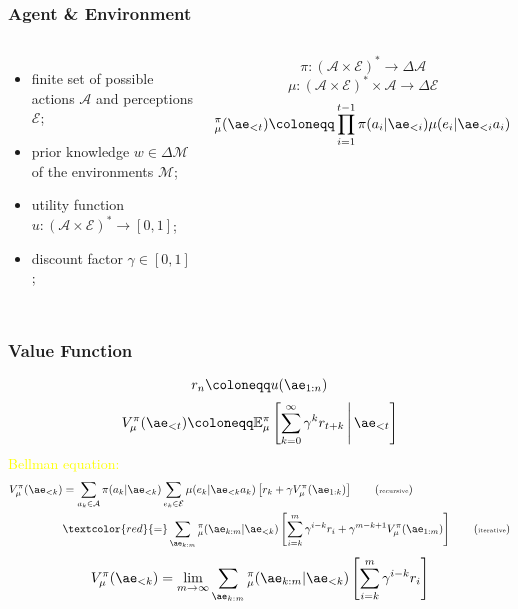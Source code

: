 \documentclass[UTF8,11pt,colorlinks,compress,openany]{beamer}%
\begin{document}
\begin{frame}\frametitle{Agent \& Environment}
\begin{definition}
	\begin{columns}
				\begin{itemize}
					\item finite set of possible actions $\mathcal{A}$ and perceptions $\mathcal{E}$;
					\item prior knowledge $w\in\Delta\mathcal{M}$ of the environments $\mathcal{M}$;
					\item utility function $u:({\mathcal{A}} \times {\mathcal{E}})^*\to[0,1]$;
					\item discount factor $\gamma\in[0,1]$;
				\end{itemize}
				\[\pi:(\mathcal{A}\times\mathcal{E})^*\to\Delta\mathcal{A}\]
				\[\mu: (\mathcal{A}\times\mathcal{E})^*\times\mathcal{A}\to\Delta\mathcal{E}\]
				\[{}_\mu^\pi(\ae_{<t})\coloneqq \prod\limits_{i=1}^{t-1}\pi(a_i|\ae_{<i})\mu(e_i|\ae_{<i}a_i)\]
		\hspace{-11ex}
	\end{columns}
\end{definition}
\end{frame}

\begin{frame}\frametitle{Value Function}
	\[r_n\coloneqq u(\ae_{1:n})\]
	\[V_\mu^\pi(\ae_{<t})\coloneqq \mathbb{E}_\mu^\pi\left[\sum\limits_{k=0}^\infty\gamma^k r_{t+k}\,\middle|\, \ae_{<t}\right]\]
	\textcolor{yellow}{Bellman equation:}
	\begin{align*}
	V_\mu^\pi(\ae_{<k})&=\sum\limits_{a_k\in\mathcal{A}}\pi(a_k|\ae_{<k})\sum\limits_{e_k\in\mathcal{E}}\mu(e_k|\ae_{<k}a_k)\left[r_k+\gamma V_\mu^\pi(\ae_{1:k})\right]\tag{\text{\tiny{recursive}}}\\
	&\textcolor{red}{=}\sum\limits_{\ae_{k:m}}{}_\mu^\pi(\ae_{k:m}|\ae_{<k})\left[\sum\limits_{i=k}^m \gamma^{i-k} r_i+\gamma^{m-k+1} V_\mu^\pi(\ae_{1:m})\right]\tag{\text{\tiny{iterative}}}
	\end{align*}
	\[V_\mu^\pi(\ae_{<k})=\lim\limits_{m\to\infty}\sum\limits_{\ae_{k:m}}{}_\mu^\pi(\ae_{k:m}|\ae_{<k})\left[\sum\limits_{i=k}^m\gamma^{i-k}r_i\right]\]
\end{frame}
\end{document}
